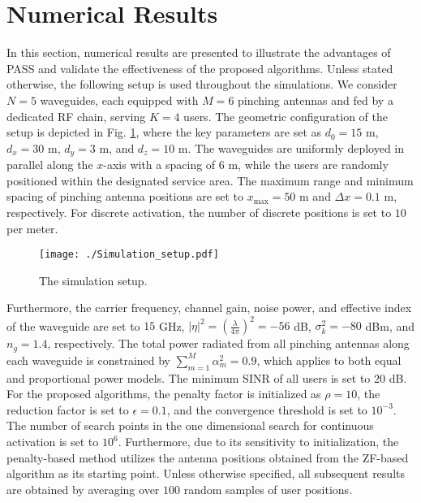 
\section{Numerical Results} \label{sec:results}


In this section, numerical results are presented to illustrate the advantages of PASS and validate the effectiveness of the proposed algorithms. Unless stated otherwise, the following setup is used throughout the simulations. We consider $N = 5$ waveguides, each equipped with $M = 6$ pinching antennas and fed by a dedicated RF chain, serving $K = 4$ users. The geometric configuration of the setup is depicted in Fig. \ref{setup}, where the key parameters are set as $d_0 = 15$ m, $d_x = 30$ m, $d_y = 3$ m, and $d_z = 10$ m. The waveguides are uniformly deployed in parallel along the $x$-axis with a spacing of $6$ m, while the users are randomly positioned within the designated service area. The maximum range and minimum spacing of pinching antenna positions are set to $x_{\max} = 50$ m and $\Delta x = 0.1$ m, respectively. For discrete activation, the number of discrete positions is set to $10$ per meter. 


\begin{figure}[t!]
  \centering
  \texttt{[image: ./Simulation\_setup.pdf]}
  \caption{The simulation setup.}
  \label{setup}
\end{figure} 

Furthermore, the carrier frequency, channel gain, noise power, and effective index of the waveguide are set to $15$ GHz, $|\eta|^2 = \left(\frac{\lambda}{4 \pi}\right)^2 = -56$ dB, $\sigma_k^2 = -80$ dBm, and $n_g = 1.4$, respectively. The total power radiated from all pinching antennas along each waveguide is constrained by $\sum_{m=1}^{M} \alpha_m^2 = 0.9$, which applies to both equal and proportional power models. The minimum SINR of all users is set to $20$ dB. For the proposed algorithms, the penalty factor is initialized as $\rho = 10$, the reduction factor is set to $\epsilon = 0.1$, and the convergence threshold is set to $10^{-3}$. The number of search points in the one dimensional search for continuous activation is set to $10^6$. Furthermore, due to its sensitivity to initialization, the penalty-based method utilizes the antenna positions obtained from the ZF-based algorithm as its starting point. Unless otherwise specified, all subsequent results are obtained by averaging over $100$ random samples of user positions.

